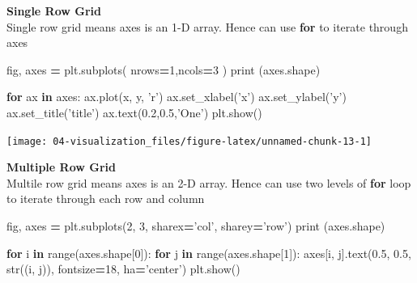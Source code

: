 \documentclass[
]{book}
\newenvironment{Shaded}{\begin{snugshade}}{\end{snugshade}}
\newcommand{\BuiltInTok}[1]{#1}
\newcommand{\ControlFlowTok}[1]{\textcolor[rgb]{0.27,0.27,0.27}{\textbf{#1}}}
\newcommand{\DecValTok}[1]{\textcolor[rgb]{0.06,0.06,0.06}{#1}}
\newcommand{\FloatTok}[1]{\textcolor[rgb]{0.06,0.06,0.06}{#1}}
\newcommand{\KeywordTok}[1]{\textcolor[rgb]{0.27,0.27,0.27}{\textbf{#1}}}
\newcommand{\NormalTok}[1]{#1}
\newcommand{\OperatorTok}[1]{\textcolor[rgb]{0.43,0.43,0.43}{\textbf{#1}}}
\newcommand{\StringTok}[1]{\textcolor[rgb]{0.5,0.5,0.5}{#1}}
\begin{document}
\textbf{Single Row Grid}\\
Single row grid means axes is an 1-D array. Hence can use \textbf{for} to iterate through axes

\begin{Shaded}
\begin{Highlighting}[]
\NormalTok{fig, axes }\OperatorTok{=}\NormalTok{ plt.subplots( nrows}\OperatorTok{=}\DecValTok{1}\NormalTok{,ncols}\OperatorTok{=}\DecValTok{3}\NormalTok{ )}
\BuiltInTok{print}\NormalTok{ (axes.shape)}
\end{Highlighting}
\end{Shaded}

\begin{Shaded}
\begin{Highlighting}[]
\ControlFlowTok{for}\NormalTok{ ax }\KeywordTok{in}\NormalTok{ axes:}
\NormalTok{    ax.plot(x, y, }\StringTok{'r'}\NormalTok{)}
\NormalTok{    ax.set_xlabel(}\StringTok{'x'}\NormalTok{)}
\NormalTok{    ax.set_ylabel(}\StringTok{'y'}\NormalTok{)}
\NormalTok{    ax.set_title(}\StringTok{'title'}\NormalTok{)}
\NormalTok{    ax.text(}\FloatTok{0.2}\NormalTok{,}\FloatTok{0.5}\NormalTok{,}\StringTok{'One'}\NormalTok{)}
\NormalTok{plt.show()}
\end{Highlighting}
\end{Shaded}

\texttt{[image: 04-visualization\_files/figure-latex/unnamed-chunk-13-1]}

\textbf{Multiple Row Grid}\\
Multile row grid means axes is an 2-D array. Hence can use two levels of \textbf{for} loop to iterate through each row and column

\begin{Shaded}
\begin{Highlighting}[]
\NormalTok{fig, axes }\OperatorTok{=}\NormalTok{ plt.subplots(}\DecValTok{2}\NormalTok{, }\DecValTok{3}\NormalTok{, sharex}\OperatorTok{=}\StringTok{'col'}\NormalTok{, sharey}\OperatorTok{=}\StringTok{'row'}\NormalTok{)}
\BuiltInTok{print}\NormalTok{ (axes.shape)}
\end{Highlighting}
\end{Shaded}

\begin{Shaded}
\begin{Highlighting}[]
\ControlFlowTok{for}\NormalTok{ i }\KeywordTok{in} \BuiltInTok{range}\NormalTok{(axes.shape[}\DecValTok{0}\NormalTok{]):}
    \ControlFlowTok{for}\NormalTok{ j }\KeywordTok{in} \BuiltInTok{range}\NormalTok{(axes.shape[}\DecValTok{1}\NormalTok{]):}
\NormalTok{        axes[i, j].text(}\FloatTok{0.5}\NormalTok{, }\FloatTok{0.5}\NormalTok{, }\BuiltInTok{str}\NormalTok{((i, j)),}
\NormalTok{                      fontsize}\OperatorTok{=}\DecValTok{18}\NormalTok{, ha}\OperatorTok{=}\StringTok{'center'}\NormalTok{)}
\NormalTok{plt.show()}
\end{Highlighting}
\end{Shaded}
\end{document}
